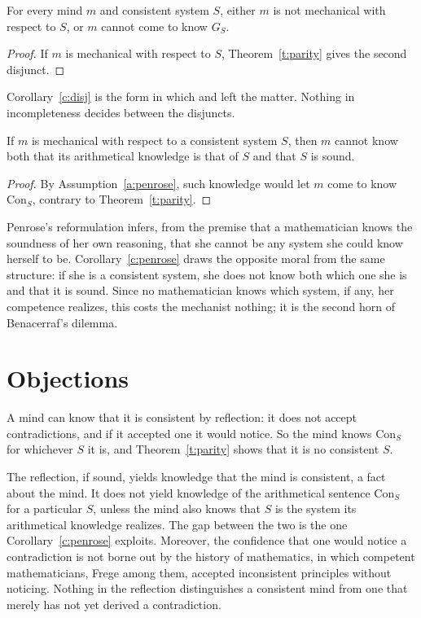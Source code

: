 \documentclass{situationist-preprint}
\begin{document}
\begin{corollary}\label{c:disj}
For every mind $m$ and consistent system $S$, either $m$ is not mechanical with respect to $S$, or $m$ cannot come to know $G_S$.
\end{corollary}

\begin{proof}
If $m$ is mechanical with respect to $S$, Theorem~\ref{t:parity} gives the second disjunct.
\end{proof}

Corollary~\ref{c:disj} is the form in which \citet{Godel1951} and \citet{Benacerraf1967} left the matter. Nothing in incompleteness decides between the disjuncts.

\begin{corollary}\label{c:penrose}
If $m$ is mechanical with respect to a consistent system $S$, then $m$ cannot know both that its arithmetical knowledge is that of $S$ and that $S$ is sound.
\end{corollary}

\begin{proof}
By Assumption~\ref{a:penrose}, such knowledge would let $m$ come to know $\mathrm{Con}_S$, contrary to Theorem~\ref{t:parity}.
\end{proof}

Penrose's reformulation infers, from the premise that a mathematician knows the soundness of her own reasoning, that she cannot be any system she could know herself to be. Corollary~\ref{c:penrose} draws the opposite moral from the same structure: if she is a consistent system, she does not know both which one she is and that it is sound. Since no mathematician knows which system, if any, her competence realizes, this costs the mechanist nothing; it is the second horn of Benacerraf's dilemma.

\section{Objections}

\begin{objection}
A mind can know that it is consistent by reflection: it does not accept contradictions, and if it accepted one it would notice. So the mind knows $\mathrm{Con}_S$ for whichever $S$ it is, and Theorem~\ref{t:parity} shows that it is no consistent $S$.
\end{objection}

\begin{reply}
The reflection, if sound, yields knowledge that the mind is consistent, a fact about the mind. It does not yield knowledge of the arithmetical sentence $\mathrm{Con}_S$ for a particular $S$, unless the mind also knows that $S$ is the system its arithmetical knowledge realizes. The gap between the two is the one Corollary~\ref{c:penrose} exploits. Moreover, the confidence that one would notice a contradiction is not borne out by the history of mathematics, in which competent mathematicians, Frege among them, accepted inconsistent principles without noticing. Nothing in the reflection distinguishes a consistent mind from one that merely has not yet derived a contradiction.
\end{reply}
\end{document}

